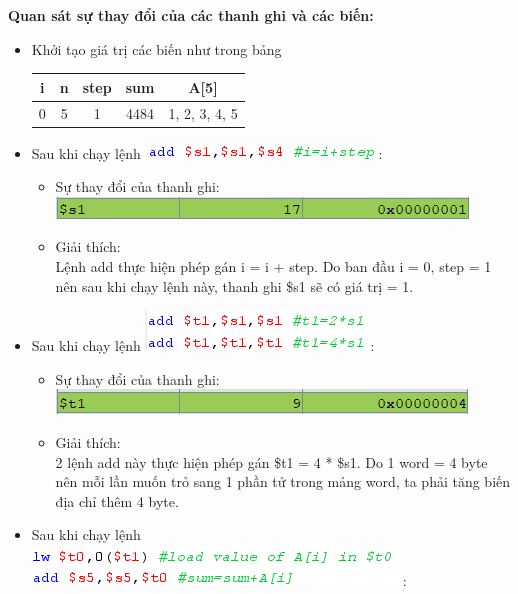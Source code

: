 \documentclass[12pt,a4paper,oneside]{article}
\begin{document}
\noindent \textbf{Quan sát sự thay đổi của các thanh ghi và các biến:}
\begin{itemize}
\item Khởi tạo giá trị các biến như trong bảng
\begin{center}
\begin{tabular}{|c|c|c|c|c|}
\hline 
i & n & step & sum & A[5] \\ 
\hline 
0 & 5 & 1 & 4484 & 1, 2, 3, 4, 5 \\ 
\hline 
\end{tabular} 
\end{center}
\item Sau khi chạy lệnh \quad \includegraphics[scale=1]{image/2.2}:\\
\begin{itemize}

\item Sự thay đổi của thanh ghi: \includegraphics[scale=1]{image/2.3}
\item Giải thích:\\
Lệnh add thực hiện phép gán i = i + step. Do ban đầu i = 0, step = 1 nên sau khi chạy lệnh này, thanh ghi \$s1 sẽ có giá trị = 1.
\end{itemize}


\item Sau khi chạy lệnh \quad \includegraphics[scale=1]{image/2.4}:\\
\begin{itemize}

\item Sự thay đổi của thanh ghi: \includegraphics[scale=1]{image/2.5}
\item Giải thích:\\
2 lệnh add này thực hiện phép gán \$t1 = 4 * \$s1. Do 1 word = 4 byte nên mỗi lần muốn trỏ sang 1 phần tử trong mảng word, ta phải tăng biến địa chỉ thêm 4 byte.
\end{itemize}


\item Sau khi chạy lệnh \quad \includegraphics[scale=1]{image/2.6}:\\
\begin{itemize}


\end{itemize}
\end{itemize}
\end{document}
